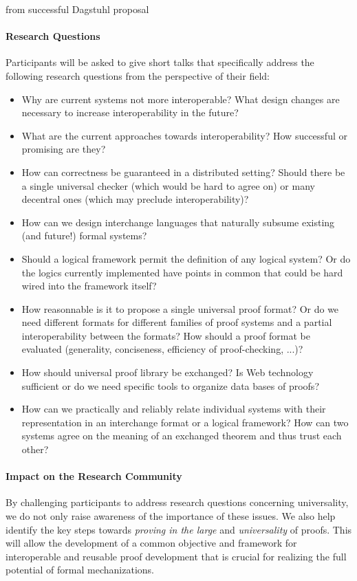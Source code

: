 \begin{oldpart}{from successful Dagstuhl proposal}
\paragraph{Research Questions}
Participants will be asked to give short talks that specifically address the following research questions from the perspective of their field:

\begin{itemize}
\item Why are current systems not more interoperable? What design changes are necessary to increase interoperability in the future?
\item What are the current approaches towards interoperability? How successful or promising are they?
\item How can correctness be guaranteed in a distributed setting?
 Should there be a single universal checker (which would be hard to agree on) or many decentral ones (which may preclude interoperability)?
\item How can we design interchange languages that naturally subsume
  existing (and future!) formal systems?
\item Should a logical framework permit the definition of any logical system?
Or do the logics currently implemented have points in common that could
be hard wired into the framework itself?
\item How reasonnable is it to propose a single universal proof format?
Or do we need different formats for different families of
proof systems and a partial interoperability between the formats?
 How should a proof format be evaluated (generality, conciseness,
efficiency of proof-checking, ...)?
\item How should universal proof library be exchanged? Is Web technology
sufficient or do we need specific tools to organize data bases of
proofs?
\item How can we practically and reliably relate individual systems with their representation in an interchange format or a logical framework?
How can two systems agree on the meaning of an exchanged theorem and thus trust each other?
\end{itemize}

\paragraph{Impact on the Research Community}
By challenging participants to address research questions concerning
universality, we do not only raise awareness of the importance of these issues.
We also help identify the key steps towards \emph{proving in the large} and  \emph{universality} of proofs.
This will allow the development of a common objective and framework for interoperable and reusable proof development that is crucial for realizing the full potential of formal mechanizations.


\end{oldpart}
